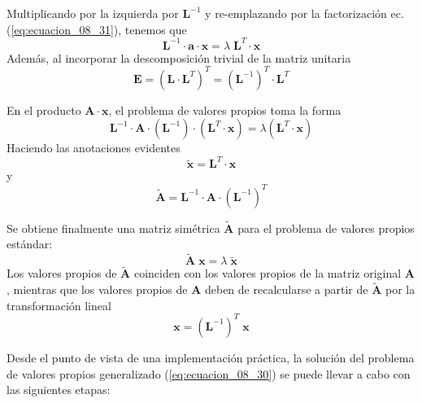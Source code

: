 \begin{frame}
Multiplicando por la izquierda por $\mathbf{L}^{-1}$ y re-emplazando por la factorización ec. (\ref{eq:ecuacion_08_31}), tenemos que
\[ \mathbf{L}^{-1} \cdot \mathbf{a} \cdot \mathbf{x} = \lambda \; \mathbf{L}^{T} \cdot \mathbf{x} \]
\pause
Además, al incorporar la descomposición trivial de la matriz unitaria
\[ \mathbf{E} = \left( \mathbf{L} \cdot \mathbf{L}^{T} \right)^{T} = \left( \mathbf{L}^{-1} \right)^{T} \cdot \mathbf{L}^{T} \]
\end{frame}
\begin{frame}
En el producto $\mathbf{A} \cdot \mathbf{x}$, el problema de valores propios toma la forma
\[ \mathbf{L}^{-1} \cdot \mathbf{A} \cdot \left( \mathbf{L}^{-1} \right) \cdot \left( \mathbf{L}^{T} \cdot \mathbf{x} \right) = \lambda \left( \mathbf{L}^{T} \cdot \mathbf{x} \right) \]
\pause
Haciendo las anotaciones evidentes
\begin{equation}
\mathbf{\widetilde{x}} = \mathbf{L}^{T} \cdot \mathbf{x}
\label{eq:ecuacion_08_32}
\end{equation}
y
\begin{equation}
\mathbf{\widetilde{A}} = \mathbf{L}^{-1} \cdot \mathbf{A} \cdot \left( \mathbf{L}^{-1} \right)^{T}
\label{eq:ecuacion_08_33}
\end{equation}
\end{frame}
\begin{frame}
Se obtiene finalmente una matriz simétrica $\mathbf{\widetilde{A}}$ para el problema de valores propios estándar:
\begin{equation}
\mathbf{\widetilde{A}} \; \mathbf{x} = \lambda \; \mathbf{\widetilde{x}}
\label{eq:ecuacion_08_34}
\end{equation}
\pause
Los valores propios de $\mathbf{\widetilde{A}}$ coinciden con los valores propios de la matriz original $\mathbf{A}$, mientras que los valores propios de $\mathbf{A}$ deben de recalcularse a partir de $\mathbf{\widetilde{A}}$ por la transformación lineal
\begin{equation}
\mathbf{x} = \left( \mathbf{L}^{-1} \right)^{T} \; \mathbf{x}
\label{eq:ecuacion_08_35}
\end{equation}
\end{frame}
\begin{frame}
Desde el punto de vista de una implementación práctica, la solución del problema de valores propios generalizado (\ref{eq:ecuacion_08_30}) se puede llevar a cabo con las siguientes etapas:
\end{frame}
